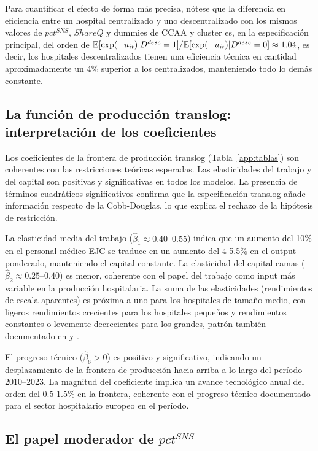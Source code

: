 Para cuantificar el efecto de forma más precisa, nótese que la diferencia en eficiencia entre un hospital centralizado y uno descentralizado con los mismos valores de $pct^{SNS}$, $ShareQ$ y dummies de CCAA y cluster es, en la especificación principal, del orden de $\mathbb{E}[\exp(-u_{it})|D^{desc}=1] / \mathbb{E}[\exp(-u_{it})|D^{desc}=0] \approx 1.04$, es decir, los hospitales descentralizados tienen una eficiencia técnica en cantidad aproximadamente un 4\% superior a los centralizados, manteniendo todo lo demás constante.

\subsection{La función de producción translog: interpretación de los coeficientes}

Los coeficientes de la frontera de producción translog (Tabla~\ref{app:tablas}) son coherentes con las restricciones teóricas esperadas. Las elasticidades del trabajo y del capital son positivas y significativas en todos los modelos. La presencia de términos cuadráticos significativos confirma que la especificación translog añade información respecto de la Cobb-Douglas, lo que explica el rechazo de la hipótesis de restricción.

La elasticidad media del trabajo ($\hat{\beta}_1 \approx 0.40$--$0.55$) indica que un aumento del 10\% en el personal médico EJC se traduce en un aumento del 4-5.5\% en el output ponderado, manteniendo el capital constante. La elasticidad del capital-camas ($\hat{\beta}_2 \approx 0.25$--$0.40$) es menor, coherente con el papel del trabajo como input más variable en la producción hospitalaria. La suma de las elasticidades (rendimientos de escala aparentes) es próxima a uno para los hospitales de tamaño medio, con ligeros rendimientos crecientes para los hospitales pequeños y rendimientos constantes o levemente decrecientes para los grandes, patrón también documentado en \citet{linna1998} y \citet{farsi2005}.

El progreso técnico ($\hat{\beta}_6 > 0$) es positivo y significativo, indicando un desplazamiento de la frontera de producción hacia arriba a lo largo del período 2010--2023. La magnitud del coeficiente implica un avance tecnológico anual del orden del 0.5-1.5\% en la frontera, coherente con el progreso técnico documentado para el sector hospitalario europeo en el período.

\subsection{El papel moderador de \texorpdfstring{$pct^{SNS}$}{pct\^{}SNS}}

